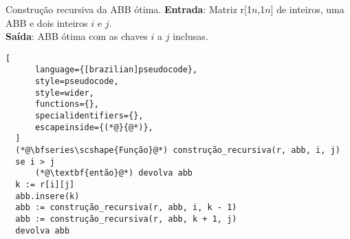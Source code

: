 
\begin{programruledcaption}{Construção recursiva da ABB ótima.\label{prog:abb-construcao}}
  \noindent\textbf{Entrada}: Matriz r[1\tdots$n$,1\tdots$n$] de inteiros, uma ABB e dois inteiros $i$ e $j$. \\
  \textbf{Saída}: ABB ótima com as chaves $i$ a $j$ inclusas.
  \vspace{-0.5\baselineskip}
  \begin{lstlisting}[
      language={[brazilian]pseudocode},
      style=pseudocode,
      style=wider,
      functions={},
      specialidentifiers={},
      escapeinside={(*@}{@*)},
  ]
  (*@\bfseries\scshape{Função}@*) construção_recursiva(r, abb, i, j)
  se i > j
      (*@\textbf{então}@*) devolva abb
  k := r[i][j]
  abb.insere(k)
  abb := construção_recursiva(r, abb, i, k - 1)
  abb := construção_recursiva(r, abb, k + 1, j)
  devolva abb
  \end{lstlisting}
  \vspace{-0.5\baselineskip}
\end{programruledcaption}
